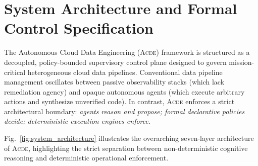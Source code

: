 
\section{System Architecture and Formal Control Specification}
\label{sec:architecture}

The Autonomous Cloud Data Engineering (\textsc{Acde}) framework is structured as a decoupled, policy-bounded supervisory control plane designed to govern mission-critical heterogeneous cloud data pipelines. Conventional data pipeline management oscillates between passive observability stacks (which lack remediation agency) and opaque autonomous agents (which execute arbitrary actions and synthesize unverified code). In contrast, \textsc{Acde} enforces a strict architectural boundary: \emph{agents reason and propose; formal declarative policies decide; deterministic execution engines enforce}. 

Fig.~\ref{fig:system_architecture} illustrates the overarching seven-layer architecture of \textsc{Acde}, highlighting the strict separation between non-deterministic cognitive reasoning and deterministic operational enforcement.

